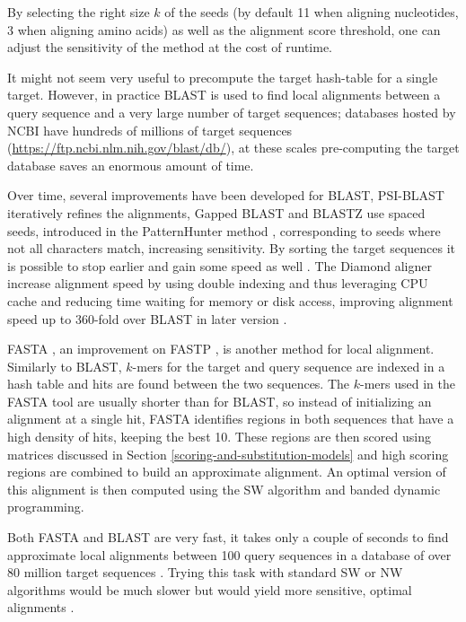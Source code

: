 \documentclass[
  11pt,
  twoside,
  BCOR=10mm,
  listof=totoc]{scrbook}
\begin{document}
By selecting the right size \(k\) of the seeds (by default 11 when aligning nucleotides, 3 when aligning amino acids) as well as the alignment score threshold, one can adjust the sensitivity of the method at the cost of runtime.

It might not seem very useful to precompute the target hash-table for a single target. However, in practice BLAST is used to find local alignments between a query sequence and a very large number of target sequences; databases hosted by NCBI have hundreds of millions of target sequences (\url{https://ftp.ncbi.nlm.nih.gov/blast/db/}), at these scales pre-computing the target database saves an enormous amount of time.

Over time, several improvements have been developed for BLAST, PSI-BLAST \autocite{altschulGappedBLASTPSIBLAST1997} iteratively refines the alignments, Gapped BLAST \autocite{altschulGappedBLASTPSIBLAST1997}and BLASTZ \autocite{schwartzHumanMouseAlignments2003} use spaced seeds, introduced in the PatternHunter method \autocite{maPatternHunterFasterMore2002}, corresponding to seeds where not all characters match, increasing sensitivity. By sorting the target sequences it is possible to stop earlier and gain some speed as well \autocite{edgarSearchClusteringOrders2010}. The Diamond aligner \autocite{buchfinkFastSensitiveProtein2015} increase alignment speed by using double indexing and thus leveraging CPU cache and reducing time waiting for memory or disk access, improving alignment speed up to 360-fold over BLAST in later version \autocite{buchfinkSensitiveProteinAlignments2021}.

FASTA \autocite{pearsonImprovedToolsBiological1988}, an improvement on FASTP \autocite{lipmanRapidSensitiveProtein1985}, is another method for local alignment. Similarly to BLAST, \(k\)-mers for the target and query sequence are indexed in a hash table and hits are found between the two sequences. The \(k\)-mers used in the FASTA tool are usually shorter than for BLAST, so instead of initializing an alignment at a single hit, FASTA identifies regions in both sequences that have a high density of hits, keeping the best 10. These regions are then scored using matrices discussed in Section \ref{scoring-and-substitution-models} and high scoring regions are combined to build an approximate alignment. An optimal version of this alignment is then computed using the SW algorithm and banded dynamic programming.

Both FASTA and BLAST are very fast, it takes only a couple of seconds to find approximate local alignments between 100 query sequences \autocite{saripellaBenchmarkingNextGeneration2016} in a database of over 80 million target sequences \autocite{finnPfamProteinFamilies2016}. Trying this task with standard SW or NW algorithms would be much slower \autocite{essoussiComparisonFourPairwise2007} but would yield more sensitive, optimal alignments \autocite{shpaerSensitivitySelectivityProtein1996}.
\end{document}
